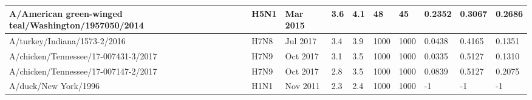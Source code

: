 \begin{tabular}{L{1.9in}|L{.35in}|L{.35in}|L{.35in}|L{.35in}|L{.35in}|L{.35in}|L{.35in}|L{.35in}|L{.35in}}
 A/American  green-winged  teal/Washington/1957050/2014 &H5N1& Mar  2015 &3.6&4.1&48&45&0.2352&0.3067&0.2686\\\hline
 A/turkey/Indiana/1573-2/2016 &H7N8& Jul  2017 &3.4&3.9&1000&1000&0.0438&0.4165&0.1351\\\hline
 A/chicken/Tennessee/17-007431-3/2017 &H7N9& Oct  2017 &3.1&3.5&1000&1000&0.0335&0.5127&0.1310\\\hline
 A/chicken/Tennessee/17-007147-2/2017 &H7N9& Oct  2017 &2.8&3.5&1000&1000&0.0839&0.5127&0.2075\\\hline
 A/duck/New  York/1996 &H1N1& Nov  2011 &2.3&2.4&1000&1000&-1&-1&-1\\\hline
\end{tabular}
